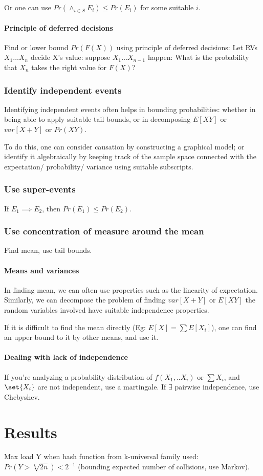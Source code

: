 \documentclass[oneside, article]{memoir}
\begin{document}
Or one can use $Pr(\land_{i \in S} E_i)  \leq Pr(E_i)$ for some suitable $i$.

\subsubsection{Principle of deferred decisions}
Find or lower bound $Pr(F(X))$ using principle of deferred decisions: Let RVs $X_{1} \dots X_{n}$ decide X's value: suppose $X_{1} \dots X_{n-1}$ happen: What is the probability that $X_{n}$ takes the right value for $F(X)$?

\subsection{Identify independent events}
Identifying independent events often helps in bounding probabilities: whether in being able to apply suitable tail bounds, or in decomposing $E[XY]$ or $var[X+Y]$ or $Pr(XY)$.

To do this, one can consider causation by constructing a graphical model; or identify it algebraically by keeping track of the sample space connected with the expectation/ probability/ variance using suitable subscripts.

\subsection{Use super-events}
If $E_1 \implies E_2$, then $Pr(E_1) \leq Pr(E_2)$.

\subsection{Use concentration of measure around the mean}
Find mean, use tail bounds.

\subsubsection{Means and variances}
In finding mean, we can often use properties such as the linearity of expectation. Similarly, we can decompose the problem of finding $var[X+Y]$ or $E[XY]$ the random variables involved have suitable independence properties.

If it is difficult to find the mean directly (Eg: $E[X] = \sum E[X_{i}]$), one can find an upper bound to it by other means, and use it.

\subsubsection{Dealing with lack of independence}
If you're analyzing a probability distribution of $f(X_{1}, .. X_{i})$ or $\sum X_{i}$, and $\set{X_{i}}$ are not independent, use a martingale. If $\exists$ pairwise independence, use Chebyshev.

\chapter{Results}
Max load Y when hash function from k-universal family used: $Pr(Y > \sqrt[k]{2n})<2^{-1}$ (bounding expected number of collisions, use Markov).





\end{document}
